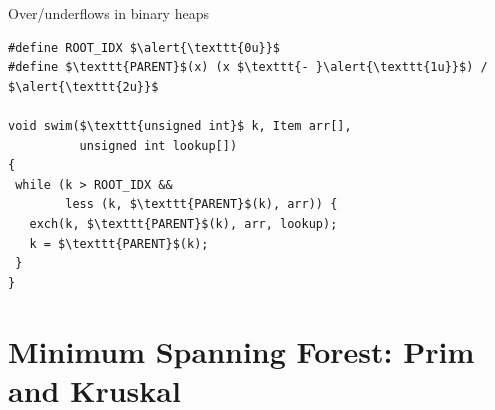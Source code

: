 \documentclass[usenames, xcolor=dvipsnames]{beamer}
\begin{document}
\addtocounter{framenumber}{-1}

\begin{frame}[fragile]{Over/underflows in binary heaps}

\begin{lstlisting}
#define ROOT_IDX $\alert{\texttt{0u}}$
#define $\texttt{PARENT}$(x) (x $\texttt{- }\alert{\texttt{1u}}$) / $\alert{\texttt{2u}}$

void swim($\texttt{unsigned int}$ k, Item arr[],
          unsigned int lookup[])
{
 while (k > ROOT_IDX &&
        less (k, $\texttt{PARENT}$(k), arr)) {
   exch(k, $\texttt{PARENT}$(k), arr, lookup);
   k = $\texttt{PARENT}$(k);
 }
}
\end{lstlisting}

\end{frame}

\section{Minimum Spanning Forest: Prim and Kruskal}
\end{document}
